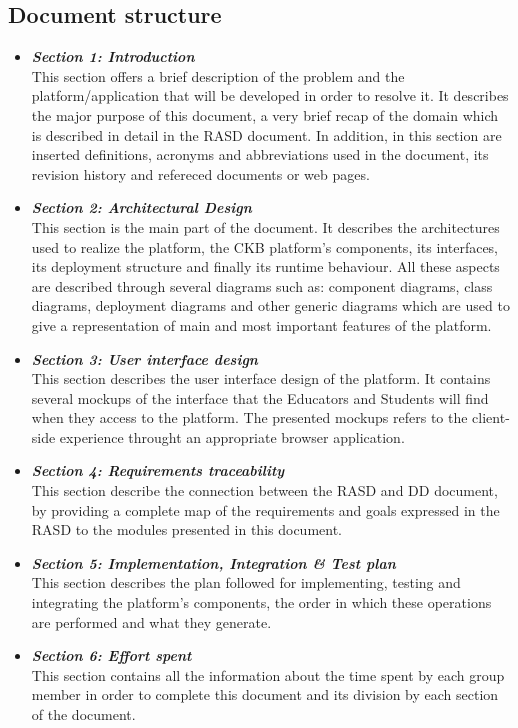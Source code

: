 \documentclass{article}
\begin{document}
{\subsection{Document structure}
\begin{itemize}
    \item \textbf{\textit{Section 1: Introduction}} \\
          This section offers a brief description of the problem and the platform/application that will be developed in order to resolve it.
          It describes the major purpose of this document, a very brief recap of the domain which is
          described in detail in the RASD document.
          In addition, in this section are inserted definitions, acronyms and abbreviations used in the document,
          its revision history and refereced documents or web pages.
    \item \textbf{\textit{Section 2: Architectural Design}} \\
          This section is the main part of the document. It describes the architectures used to
          realize the platform, the CKB platform's components, its interfaces, its deployment
          structure and finally its runtime behaviour.
          All these aspects are described through several diagrams such as:
          component diagrams, class diagrams, deployment diagrams and other
          generic diagrams which are used to give a representation of main and most important
          features of the platform.
    \item \textbf{\textit{Section 3: User interface design}} \\
          This section describes the user interface design of the platform.
          It contains several mockups of the interface that the Educators and
          Students will find when they access to the platform. The presented mockups
          refers to the client-side experience throught an appropriate browser application.
    \item \textbf{\textit{Section 4: Requirements traceability}} \\
          This section describe the connection between the RASD and DD document,
          by providing a complete map of the requirements and goals expressed in the RASD
          to the modules presented in this document.
    \item \textbf{\textit{Section 5: Implementation, Integration \& Test plan}} \\
          This section describes the plan followed for implementing, testing and
          integrating the platform's components, the order in which
          these operations are performed and what they generate.
    \item \textbf{\textit{Section 6: Effort spent}} \\
          This section contains all the information about the time spent by each group member
          in order to complete this document and its division by each section of the document.
\end{itemize}
}
\end{document}
